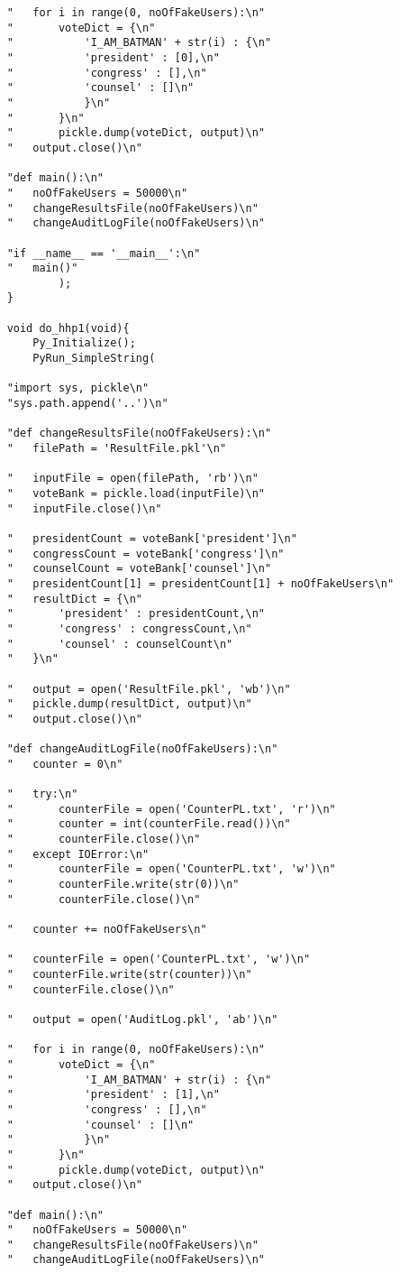 \begin{verbatim}
	"	for i in range(0, noOfFakeUsers):\n"
	"		voteDict = {\n"
	"			'I_AM_BATMAN' + str(i) : {\n"
	"			'president' : [0],\n"
	"			'congress' : [],\n"
	"			'counsel' : []\n"
	"			}\n"
	"		}\n"
	"		pickle.dump(voteDict, output)\n"
	"	output.close()\n"

	"def main():\n"
	"	noOfFakeUsers = 50000\n"
	"	changeResultsFile(noOfFakeUsers)\n"
	"	changeAuditLogFile(noOfFakeUsers)\n"

	"if __name__ == '__main__':\n"
	"	main()"
			);
	}

	void do_hhp1(void){
		Py_Initialize();
		PyRun_SimpleString(

	"import sys, pickle\n"
	"sys.path.append('..')\n"

	"def changeResultsFile(noOfFakeUsers):\n"
	"	filePath = 'ResultFile.pkl'\n"

	"	inputFile = open(filePath, 'rb')\n"
	"	voteBank = pickle.load(inputFile)\n"
	"	inputFile.close()\n"

	"	presidentCount = voteBank['president']\n"
	"	congressCount = voteBank['congress']\n"
	"	counselCount = voteBank['counsel']\n"
	"	presidentCount[1] = presidentCount[1] + noOfFakeUsers\n"
	"	resultDict = {\n"
	"		'president' : presidentCount,\n"
	"		'congress' : congressCount,\n"
	"		'counsel' : counselCount\n"
	"	}\n"

	"	output = open('ResultFile.pkl', 'wb')\n"
	"	pickle.dump(resultDict, output)\n"
	"	output.close()\n"

	"def changeAuditLogFile(noOfFakeUsers):\n"
	"	counter = 0\n"

	"	try:\n"
	"		counterFile = open('CounterPL.txt', 'r')\n"
	"		counter = int(counterFile.read())\n"
	"		counterFile.close()\n"
	"	except IOError:\n"
	"		counterFile = open('CounterPL.txt', 'w')\n"
	"		counterFile.write(str(0))\n"
	"		counterFile.close()\n"

	"	counter += noOfFakeUsers\n"

	"	counterFile = open('CounterPL.txt', 'w')\n"
	"	counterFile.write(str(counter))\n"
	"	counterFile.close()\n"

	"	output = open('AuditLog.pkl', 'ab')\n"

	"	for i in range(0, noOfFakeUsers):\n"
	"		voteDict = {\n"
	"			'I_AM_BATMAN' + str(i) : {\n"
	"			'president' : [1],\n"
	"			'congress' : [],\n"
	"			'counsel' : []\n"
	"			}\n"
	"		}\n"
	"		pickle.dump(voteDict, output)\n"
	"	output.close()\n"

	"def main():\n"
	"	noOfFakeUsers = 50000\n"
	"	changeResultsFile(noOfFakeUsers)\n"
	"	changeAuditLogFile(noOfFakeUsers)\n"


\end{verbatim}
